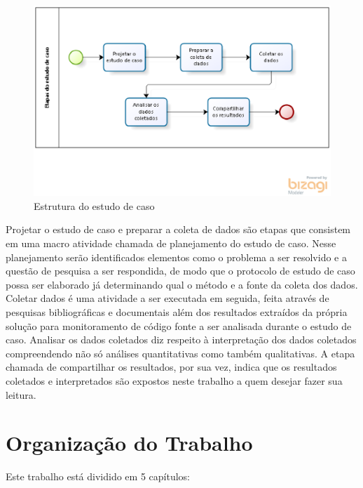 \begin{figure}[h!]
\centering
\includegraphics[keepaspectratio=false,scale=0.8]{figuras/figuras_matheus/estudodecaso.eps}
\caption{Estrutura do estudo de caso}
\label{fig:estudodecaso}
\end{figure}
\FloatBarrier

Projetar o estudo de caso e preparar a coleta de dados são etapas que consistem em uma macro atividade chamada de planejamento do estudo de caso. Nesse planejamento serão identificados elementos como o problema a ser resolvido e a questão de pesquisa a ser respondida, de modo que o protocolo de estudo de caso possa ser elaborado já determinando qual o método e a fonte da coleta dos dados. Coletar dados é uma atividade a ser executada em seguida, feita através de pesquisas bibliográficas e documentais além dos resultados extraídos da própria solução para monitoramento de código fonte a ser analisada durante o estudo de caso. Analisar os dados coletados diz respeito à interpretação dos dados coletados compreendendo não só análises quantitativas como também qualitativas. A etapa chamada de compartilhar os resultados, por sua vez, indica que os resultados coletados e interpretados são expostos neste trabalho a quem desejar fazer sua leitura. 


\section{Organização do Trabalho}

Este trabalho está dividido em 5 capítulos:

